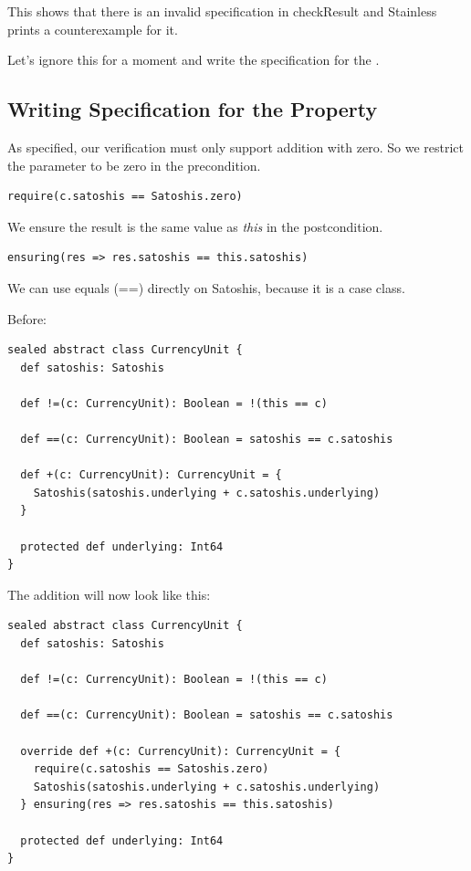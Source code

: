 \documentclass[runningheads]{llncs}
\begin{document}
This shows that there is an invalid specification in checkResult and Stainless prints a counterexample for it.

Let's ignore this for a moment and write the specification for the .


\subsection{Writing Specification for the Property}

As specified, our verification must only support addition with zero.
So we restrict the parameter to be zero in the precondition.
\begin{lstlisting}[style=scala]
  require(c.satoshis == Satoshis.zero)
\end{lstlisting}

We ensure the result is the same value as \emph{this} in the postcondition.
\begin{lstlisting}[style=scala]
  ensuring(res => res.satoshis == this.satoshis)
\end{lstlisting}

We can use equals (==) directly on Satoshis, because it is a case class.

Before:
\begin{lstlisting}[style=scala]
sealed abstract class CurrencyUnit {
  def satoshis: Satoshis

  def !=(c: CurrencyUnit): Boolean = !(this == c)

  def ==(c: CurrencyUnit): Boolean = satoshis == c.satoshis

  def +(c: CurrencyUnit): CurrencyUnit = {
    Satoshis(satoshis.underlying + c.satoshis.underlying)
  }

  protected def underlying: Int64
}
\end{lstlisting}

The addition will now look like this:
\begin{lstlisting}[style=scala]
sealed abstract class CurrencyUnit {
  def satoshis: Satoshis

  def !=(c: CurrencyUnit): Boolean = !(this == c)

  def ==(c: CurrencyUnit): Boolean = satoshis == c.satoshis
  
  override def +(c: CurrencyUnit): CurrencyUnit = {
    require(c.satoshis == Satoshis.zero)
    Satoshis(satoshis.underlying + c.satoshis.underlying)
  } ensuring(res => res.satoshis == this.satoshis)

  protected def underlying: Int64
}
\end{lstlisting}
\end{document}

